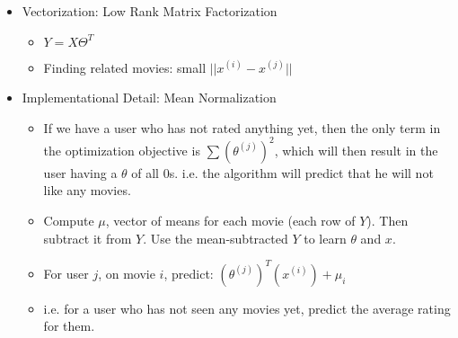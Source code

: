\documentclass[letterpaper,10pt]{article}
\begin{document}
\begin{itemize}
\item Vectorization: Low Rank Matrix Factorization
	\begin{itemize}
	\item $Y=X \Theta^T$
	\item Finding related movies: small $\vert \vert x^{(i)}-x^{(j)}\vert \vert$
	\end{itemize}
	
\item Implementational Detail: Mean Normalization
	\begin{itemize}
	\item If we have a user who has not rated anything yet, then the only term in the optimization objective is $\sum (\theta^{(j)})^2$, which will then result in the user having a $\theta$ of all 0s. i.e. the algorithm will predict that he will not like any movies.
	\item Compute $\mu$, vector of means for each movie (each row of $Y$). Then subtract it from $Y$. Use the mean-subtracted $Y$ to learn $\theta$ and $x$.
	\item For user $j$, on movie $i$, predict: $(\theta^{(j)})^T(x^{(i)}) + \mu_i$
	\item i.e. for a user who has not seen any movies yet, predict the average rating for them.
	\end{itemize}
\end{itemize}






	
	
	
	
	
	
	
	
	
	
	
	
	
	
	
\end{document}
